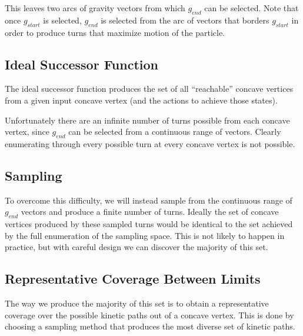 
This leaves two arcs of gravity vectors from which $g_{end}$ can be selected. Note that once $g_{start}$ is selected, $g_{end}$ is selected from the arc of vectors that borders $g_{start}$ in order to produce turns that maximize motion of the particle.

	\subsection{Ideal Successor Function}

The ideal successor function produces the set of all ``reachable'' concave vertices from a given input concave vertex (and the actions to achieve those states).

Unfortunately there are an infinite number of turns possible from each concave vertex, since $g_{end}$ can be selected from a continuous range of vectors. Clearly enumerating through every possible turn at every concave vertex is not possible.

	\subsection{Sampling}

To overcome this difficulty, we will instead sample from the continuous range of $g_{end}$ vectors and produce a finite number of turns. Ideally the set of concave vertices produced by these sampled turns would be identical to the set achieved by the full enumeration of the sampling space. This is not likely to happen in practice, but with careful design we can discover the majority of this set.


	\subsection{Representative Coverage Between Limits}

The way we produce the majority of this set is to obtain a representative coverage over the possible kinetic paths out of a concave vertex. This is done by choosing a sampling method that produces the most diverse set of kinetic paths.

